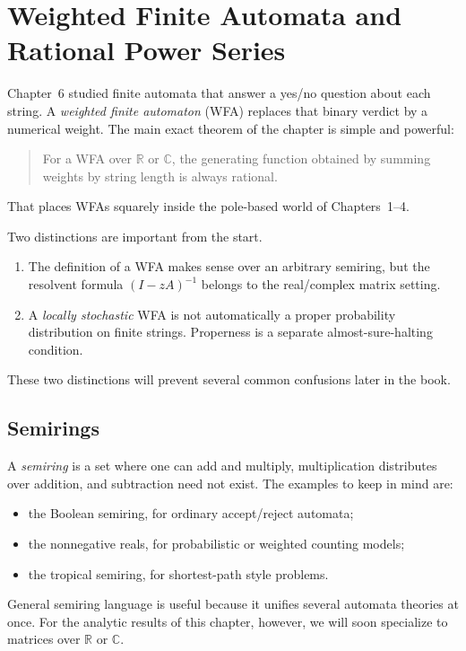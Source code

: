 \chapter{Weighted Finite Automata and Rational Power Series}
\label{ch07:top}

Chapter~6 studied finite automata that answer a yes/no question about each string. A \emph{weighted finite automaton} (WFA) replaces that binary verdict by a numerical weight. The main exact theorem of the chapter is simple and powerful:
\begin{quote}
For a WFA over $\mathbb{R}$ or $\mathbb{C}$, the generating function obtained by summing weights by string length is always rational.
\end{quote}
That places WFAs squarely inside the pole-based world of Chapters~1--4.

Two distinctions are important from the start.
\begin{enumerate}
  \item The definition of a WFA makes sense over an arbitrary semiring, but the resolvent formula $(I-zA)^{-1}$ belongs to the real/complex matrix setting.
  \item A \emph{locally stochastic} WFA is not automatically a proper probability distribution on finite strings. Properness is a separate almost-sure-halting condition.
\end{enumerate}
These two distinctions will prevent several common confusions later in the book.

\section{Semirings}

A \emph{semiring} is a set where one can add and multiply, multiplication distributes over addition, and subtraction need not exist. The examples to keep in mind are:
\begin{itemize}
  \item the Boolean semiring, for ordinary accept/reject automata;
  \item the nonnegative reals, for probabilistic or weighted counting models;
  \item the tropical semiring, for shortest-path style problems.
\end{itemize}
General semiring language is useful because it unifies several automata theories at once. For the analytic results of this chapter, however, we will soon specialize to matrices over $\mathbb{R}$ or $\mathbb{C}$.

